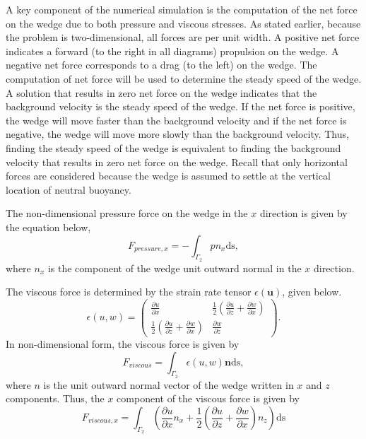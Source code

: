 \documentclass[12pt]{article}
\begin{document}
A key component of the numerical simulation is the computation of the net force on the wedge due to both pressure and viscous stresses. As stated earlier, because the problem is two-dimensional, all forces are per unit width. A positive net force indicates a forward (to the right in all diagrams) propulsion on the wedge. A negative net force corresponds to a drag (to the left) on the wedge. The computation of net force will be used to determine the steady speed of the wedge. A solution that results in zero net force on the wedge indicates that the background velocity is the steady speed of the wedge. If the net force is positive, the wedge will move faster than the background velocity and if the net force is negative, the wedge will move more slowly than the background velocity. Thus, finding the steady speed of the wedge is equivalent to finding the background velocity that results in zero net force on the wedge. Recall that only horizontal forces are considered because the wedge is assumed to settle at the vertical location of neutral buoyancy.

The non-dimensional pressure force on the wedge in the $x$ direction is given by the equation below,
\begin{equation}
F_{pressure, x}=-\int_{\Gamma_2} pn_x\text{ds},
\end{equation}
where $n_x$ is the component of the wedge unit outward normal in the $x$ direction.

The viscous force is determined by the strain rate tensor $\epsilon(\mathbf{u})$, given below.
\begin{equation}
\epsilon(u,w)=
\begin{pmatrix}
\frac{\partial u}{\partial x} & \frac{1}{2}(\frac{\partial u}{\partial z}+\frac{\partial w}{\partial x})  \\
\frac{1}{2}(\frac{\partial u}{\partial z}+\frac{\partial w}{\partial x})  & \frac{\partial w}{\partial z}
\end{pmatrix}.
\end{equation}
In non-dimensional form, the viscous force is given by
\begin{equation}
F_{viscous}=\int_{\Gamma_2} \epsilon(u,w)\mathbf{n}\text{ds},
\end{equation}
where $n$ is the unit outward normal vector of the wedge written in $x$ and $z$ components. Thus, the $x$ component of the viscous force is given by
\begin{equation}
F_{viscous, x} = \int_{\Gamma_2} \left( \frac{\partial u}{\partial x}n_x+\frac{1}{2}\left(\frac{\partial u}{\partial z}+\frac{\partial w}{\partial x}\right)n_z\right) \text{ds}
\end{equation}
\end{document}
